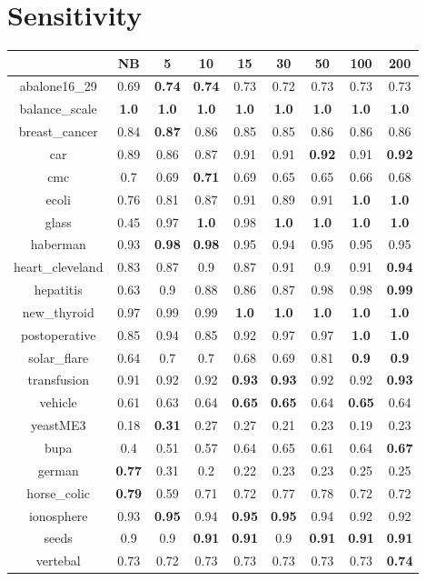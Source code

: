 \documentclass{article}%
\begin{document}
%
\section*{Sensitivity}%
\begin{tabular}{c|cccccccc}%
\hline%
&NB&5&10&15&30&50&100&200\\%
\hline%
abalone16\_29&0.69&\textbf{0.74}&\textbf{0.74}&0.73&0.72&0.73&0.73&0.73\\%
\hline%
balance\_scale&\textbf{1.0}&\textbf{1.0}&\textbf{1.0}&\textbf{1.0}&\textbf{1.0}&\textbf{1.0}&\textbf{1.0}&\textbf{1.0}\\%
\hline%
breast\_cancer&0.84&\textbf{0.87}&0.86&0.85&0.85&0.86&0.86&0.86\\%
\hline%
car&0.89&0.86&0.87&0.91&0.91&\textbf{0.92}&0.91&\textbf{0.92}\\%
\hline%
cmc&0.7&0.69&\textbf{0.71}&0.69&0.65&0.65&0.66&0.68\\%
\hline%
ecoli&0.76&0.81&0.87&0.91&0.89&0.91&\textbf{1.0}&\textbf{1.0}\\%
\hline%
glass&0.45&0.97&\textbf{1.0}&0.98&\textbf{1.0}&\textbf{1.0}&\textbf{1.0}&\textbf{1.0}\\%
\hline%
haberman&0.93&\textbf{0.98}&\textbf{0.98}&0.95&0.94&0.95&0.95&0.95\\%
\hline%
heart\_cleveland&0.83&0.87&0.9&0.87&0.91&0.9&0.91&\textbf{0.94}\\%
\hline%
hepatitis&0.63&0.9&0.88&0.86&0.87&0.98&0.98&\textbf{0.99}\\%
\hline%
new\_thyroid&0.97&0.99&0.99&\textbf{1.0}&\textbf{1.0}&\textbf{1.0}&\textbf{1.0}&\textbf{1.0}\\%
\hline%
postoperative&0.85&0.94&0.85&0.92&0.97&0.97&\textbf{1.0}&\textbf{1.0}\\%
\hline%
solar\_flare&0.64&0.7&0.7&0.68&0.69&0.81&\textbf{0.9}&\textbf{0.9}\\%
\hline%
transfusion&0.91&0.92&0.92&\textbf{0.93}&\textbf{0.93}&0.92&0.92&\textbf{0.93}\\%
\hline%
vehicle&0.61&0.63&0.64&\textbf{0.65}&\textbf{0.65}&0.64&\textbf{0.65}&0.64\\%
\hline%
yeastME3&0.18&\textbf{0.31}&0.27&0.27&0.21&0.23&0.19&0.23\\%
\hline%
bupa&0.4&0.51&0.57&0.64&0.65&0.61&0.64&\textbf{0.67}\\%
\hline%
german&\textbf{0.77}&0.31&0.2&0.22&0.23&0.23&0.25&0.25\\%
\hline%
horse\_colic&\textbf{0.79}&0.59&0.71&0.72&0.77&0.78&0.72&0.72\\%
\hline%
ionosphere&0.93&\textbf{0.95}&0.94&\textbf{0.95}&\textbf{0.95}&0.94&0.92&0.92\\%
\hline%
seeds&0.9&0.9&\textbf{0.91}&\textbf{0.91}&0.9&\textbf{0.91}&\textbf{0.91}&\textbf{0.91}\\%
\hline%
vertebal&0.73&0.72&0.73&0.73&0.73&0.73&0.73&\textbf{0.74}\\%
\hline%
\end{tabular}
\end{document}
